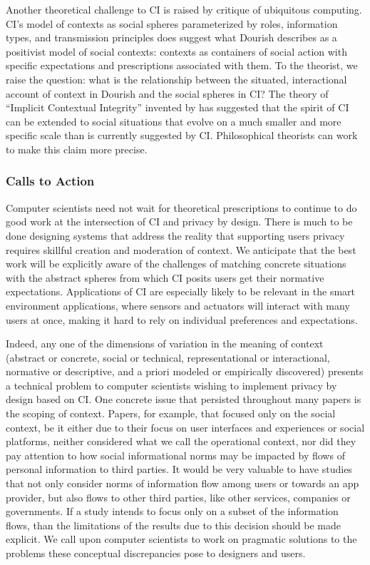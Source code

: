 \documentclass[../thesis.tex]{subfiles}
\begin{document}
Another theoretical challenge to CI is raised by
\citet{dourish2004we} critique of ubiquitous computing.
CI's model of contexts as social spheres parameterized
by roles, information types, and transmission principles does suggest
what Dourish describes as a positivist model of social contexts:
contexts as containers of social action with specific
expectations and
prescriptions associated with them. To the theorist, we raise the
question: what is the relationship between the situated,
interactional
account of context in Dourish and the social spheres in CI?
The theory
of ``Implicit Contextual Integrity''
invented by \citet{criado2015implicit} has suggested that the
spirit of CI
can be extended to social situations that evolve on a much
smaller and
more specific scale than is currently suggested by CI.
Philosophical
theorists can work to make this claim more precise.

\subsubsection{Calls to Action}
\label{CI5.2.2}

Computer scientists need not wait for theoretical prescriptions to
continue to do good work at the intersection of CI and privacy by
design. There is much to be done designing systems that address the
reality that supporting users privacy requires skillful creation and
moderation of context. We anticipate that the best work will be
explicitly aware of the challenges of matching concrete situations with
the abstract spheres from which CI posits users get their normative
expectations. Applications of CI are especially likely to be relevant
in the smart environment applications, where sensors and actuators will
interact with many users at once, making it hard to rely on individual
preferences and expectations. 

Indeed, any one of the dimensions of variation in the meaning of context
(abstract or concrete, social or technical, representational or
interactional, normative or descriptive, and a priori modeled or
empirically discovered) presents a technical problem to computer
scientists wishing to implement privacy by design based on CI. One
concrete issue that persisted throughout many papers is the scoping of
context. Papers, for example, that focused only on the social context,
be it either due to their focus on user interfaces and experiences or
social platforms, neither considered what we call the operational
context, nor did they pay attention to how social informational norms
may be impacted by flows of personal information to third parties. It
would be very valuable to have studies that not only consider norms of
information flow among users or towards an app provider, but also flows
to other third parties, like other services, companies or governments.
If a study intends to focus only on a subset of the information flows,
than the limitations of the results due to this decision should be made
explicit. We call upon computer scientists to work on pragmatic
solutions to the problems these conceptual discrepancies pose to
designers and users.
\end{document}
